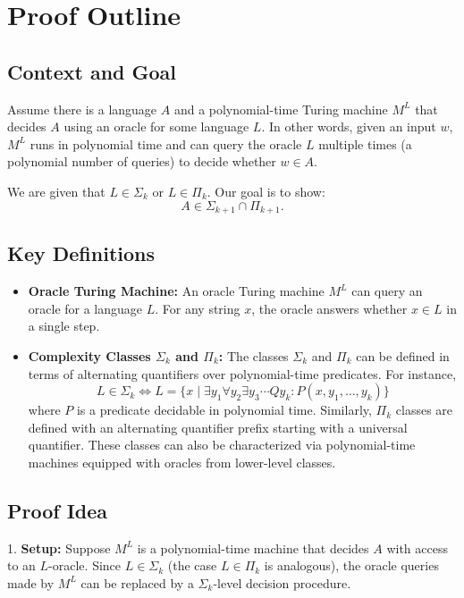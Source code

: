 \documentclass[a4paper]{article}
\begin{document}
\section*{Proof Outline}
\subsection*{Context and Goal}
Assume there is a language \( A \) and a polynomial-time Turing machine \( M^L \) that decides \( A \) using an oracle for some language \( L \). In other words, given an input \( w \), \( M^L \) runs in polynomial time and can query the oracle \( L \) multiple times (a polynomial number of queries) to decide whether \( w \in A \).

We are given that \( L \in \Sigma_k \) or \( L \in \Pi_k \). Our goal is to show:
\[
A \in \Sigma_{k+1} \cap \Pi_{k+1}.
\]

\subsection*{Key Definitions}
\begin{itemize}
  \item \textbf{Oracle Turing Machine:} An oracle Turing machine \( M^L \) can query an oracle for a language \( L \). For any string \( x \), the oracle answers whether \( x \in L \) in a single step.

  \item \textbf{Complexity Classes \(\Sigma_k\) and \(\Pi_k\):}  
    The classes \(\Sigma_k\) and \(\Pi_k\) can be defined in terms of alternating quantifiers over polynomial-time predicates. For instance,
    \[
    L \in \Sigma_k \iff L = \{x \mid \exists y_1 \forall y_2 \exists y_3 \cdots Q y_k : P(x,y_1,\dots,y_k)\}
    \]
    where \( P \) is a predicate decidable in polynomial time. Similarly, \(\Pi_k\) classes are defined with an alternating quantifier prefix starting with a universal quantifier. These classes can also be characterized via polynomial-time machines equipped with oracles from lower-level classes.
\end{itemize}

\subsection*{Proof Idea}
1. \textbf{Setup:}
   Suppose \( M^L \) is a polynomial-time machine that decides \( A \) with access to an \( L \)-oracle. Since \( L \in \Sigma_k \) (the case \( L \in \Pi_k \) is analogous), the oracle queries made by \( M^L \) can be replaced by a \(\Sigma_k\)-level decision procedure.
\end{document}
